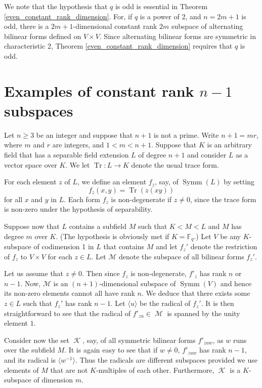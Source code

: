 \documentclass{amsart}
\DeclareMathOperator{\Tr}{Tr}
\DeclareMathOperator{\M}{\mathcal{M}}
\DeclareMathOperator{\K}{\mathcal{K}}
\DeclareMathOperator{\Symm}{Symm}
\theoremstyle{plain}
\theoremstyle{definition}
\begin{document}
We note that the hypothesis that $q$ is odd is essential in Theorem \ref{even_constant_rank_dimension}. For, if $q$ is a power of 2, and $n=2m+1$ is odd, there is a $2m+1$-dimensional constant rank $2m$ subspace of alternating bilinear forms defined on $V\times V$. Since alternating bilinear forms are symmetric in characteristic 2, Theorem \ref{even_constant_rank_dimension} requires that $q$ is odd. 



\section{Examples of constant rank $n-1$ subspaces}

\noindent Let $n\geq 3$ be an integer and suppose that $n+1$ is not a prime. Write $n+1=mr$, where $m$ and $r$ are integers, and $1<m<n+1$. Suppose that 
$K$ is an arbitrary field that has a separable field extension $L$ of degree $n+1$ and consider $L$ as a vector space over $K$. We
let $\Tr:L\to K$ denote the usual trace form.

 For each element $z$ of $L$, we define an element $f_z$, say, of $\Symm(L)$ by setting
\[
 f_z(x,y)=\Tr(z(xy))
\]
for all $x$ and $y$ in $L$. Each form $f_z$ is non-degenerate if $z\neq 0$, since the trace form is non-zero under the hypothesis of separability.

Suppose now that $L$ contains a subfield $M$ such that $K<M<L$ and $M$ has degree $m$ over $K$. (The hypothesis is obviously met
if $K= \mathbb{F}_q$.)  
Let $V$ be any $K$-subspace of codimension 1 in $L$ that contains $M$ and let $f_z'$ denote the restriction of $f_z$ to
$V\times V$ for each $z\in L$.
Let $\mathcal{M}$ denote the subspace of all bilinear forms
$f_z'$. 

Let us assume that $z\neq 0$. Then since $f_z$ is non-degenerate, $f'_z$ has rank $n$ or $n-1$. Now, 
$\mathcal{M}$ is an $(n+1)$-dimensional subspace of  $\Symm(V)$ and hence its non-zero elements cannot all have rank $n$. We deduce that there exists some $z\in L$ such that $f_z'$ has rank $n-1$. Let $\langle u\rangle$ be the radical of $f_z'$.  It is then straightforward
to see that the radical of $f'_{zu}\in \M$ is spanned by the unity element $1$. 

Consider now the set $\K$, say, of all symmetric bilinear forms $f'_{zuw}$, as $w$ runs over the subfield $M$. It is again easy to see that if $w\neq 0$,
$f'_{zuw}$ has rank $n-1$, and its radical is $\langle w^{-1}\rangle$. Thus the radicals are different subspaces provided we use elements
of $M$ that are not $K$-multiples of each other. Furthermore, $\K$ is a $K$-subspace of dimension $m$.
\end{document}
